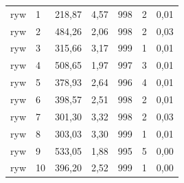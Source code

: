 \begin{longtable}{lllllll}
ryw & 1 & 218,87 & 4,57 & 998 & 2 & 0,01\\
ryw & 2 & 484,26 & 2,06 & 998 & 2 & 0,03\\
ryw & 3 & 315,66 & 3,17 & 999 & 1 & 0,01\\
ryw & 4 & 508,65 & 1,97 & 997 & 3 & 0,01\\
ryw & 5 & 378,93 & 2,64 & 996 & 4 & 0,01\\
ryw & 6 & 398,57 & 2,51 & 998 & 2 & 0,01\\
ryw & 7 & 301,30 & 3,32 & 998 & 2 & 0,03\\
ryw & 8 & 303,03 & 3,30 & 999 & 1 & 0,01\\
ryw & 9 & 533,05 & 1,88 & 995 & 5 & 0,00\\
ryw & 10 & 396,20 & 2,52 & 999 & 1 & 0,00\\
\end{longtable}
\endgroup

